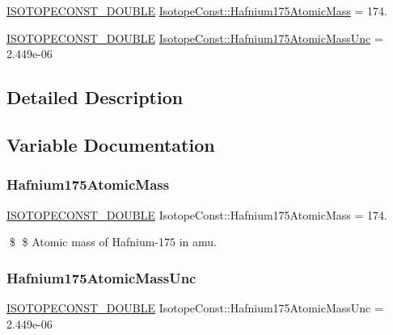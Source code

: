 \begin{DoxyCompactItemize}
\item 
\mbox{\hyperlink{group___isotope_const-_macros_ga8f45a7272ce02c0b4c65c44636ed719a}{I\+S\+O\+T\+O\+P\+E\+C\+O\+N\+S\+T\+\_\+\+D\+O\+U\+B\+LE}} \mbox{\hyperlink{group___isotope_const-_hafnium-_hf175_gaa4a02506d30552f3933cd2bc48e14cdd}{Isotope\+Const\+::\+Hafnium175\+Atomic\+Mass}} = 174.
\item 
\mbox{\hyperlink{group___isotope_const-_macros_ga8f45a7272ce02c0b4c65c44636ed719a}{I\+S\+O\+T\+O\+P\+E\+C\+O\+N\+S\+T\+\_\+\+D\+O\+U\+B\+LE}} \mbox{\hyperlink{group___isotope_const-_hafnium-_hf175_ga187ce8fc763b22f4945a9470e60ea522}{Isotope\+Const\+::\+Hafnium175\+Atomic\+Mass\+Unc}} = 2.\+449e-\/06
\end{DoxyCompactItemize}


\subsection{Detailed Description}


\subsection{Variable Documentation}
\mbox{\label{group___isotope_const-_hafnium-_hf175_gaa4a02506d30552f3933cd2bc48e14cdd}} 
\subsubsection{\texorpdfstring{Hafnium175\+Atomic\+Mass}{Hafnium175AtomicMass}}
{\footnotesize\ttfamily \mbox{\hyperlink{group___isotope_const-_macros_ga8f45a7272ce02c0b4c65c44636ed719a}{I\+S\+O\+T\+O\+P\+E\+C\+O\+N\+S\+T\+\_\+\+D\+O\+U\+B\+LE}} Isotope\+Const\+::\+Hafnium175\+Atomic\+Mass = 174.}

\$ \$ Atomic mass of Hafnium-\/175 in amu. \mbox{\label{group___isotope_const-_hafnium-_hf175_ga187ce8fc763b22f4945a9470e60ea522}} 
\subsubsection{\texorpdfstring{Hafnium175\+Atomic\+Mass\+Unc}{Hafnium175AtomicMassUnc}}
{\footnotesize\ttfamily \mbox{\hyperlink{group___isotope_const-_macros_ga8f45a7272ce02c0b4c65c44636ed719a}{I\+S\+O\+T\+O\+P\+E\+C\+O\+N\+S\+T\+\_\+\+D\+O\+U\+B\+LE}} Isotope\+Const\+::\+Hafnium175\+Atomic\+Mass\+Unc = 2.\+449e-\/06}

